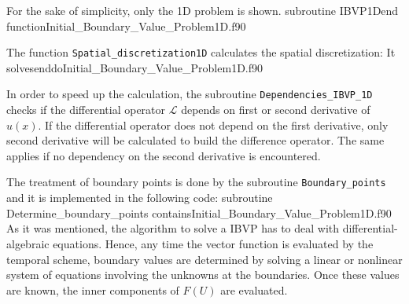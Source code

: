       
For the sake of simplicity,  only the 1D problem is shown.
        {subroutine IBVP1D}{end function}{Initial_Boundary_Value_Problem1D.f90} 
        
   
   \vspace{-0.5cm}
The function   \verb|Spatial_discretization1D|  calculates the spatial discretization: 
         {It solves}{enddo}{Initial_Boundary_Value_Problem1D.f90}      
        
\newpage  
 In order to speed up the calculation, the subroutine \verb|Dependencies_IBVP_1D| checks if the differential operator
 $ \mathcal{L} $ depends on 
 first or second derivative of $ u(x) $. If the differential operator does not depend on the first derivative, only second derivative  will be calculated to build the difference operator. The same applies if no dependency on the second derivative is encountered. 
 
 
 
 The treatment of boundary points  is done by the subroutine \verb|Boundary_points| 
 and it is implemented in the following code: 
         \vspace{0.1cm} 
                 {subroutine Determine_boundary_points}
                 {contains}{Initial_Boundary_Value_Problem1D.f90}
 As it was mentioned, the algorithm to solve a IBVP has to deal with differential-algebraic equations. Hence, any time the vector function is evaluated by the temporal scheme, boundary values are determined by solving a linear or nonlinear system of equations involving the unknowns at the boundaries. Once these values are known, the inner components of $ F (U) $ are evaluated. 
 
 
 